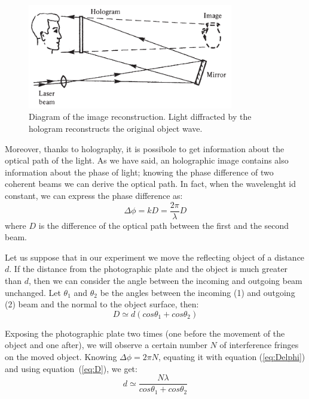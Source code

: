\documentclass[11pt,a4paper]{article}
\begin{document}
\begin{figure}[ht]
\centering
\includegraphics[width=0.8\textwidth]{Hologram_image_reconstruction}
\caption{Diagram of the image reconstruction. Light diffracted by the hologram reconstructs the original object wave.\cite{hariharan_2002}}
\label{fig:hologram_reconstruction}
\end{figure}

Moreover, thanks to holography, it is possibole to get information about the optical path of the light. As we have said, an holographic image contains also information about the phase of light; knowing the phase difference of two coherent beams we can derive the optical path. In fact, when the wavelenght id constant, we can express the phase difference as:
\begin{equation}
\Delta \phi=kD=\frac{2\pi}{\lambda}D\label{eq:Delphi}
\end{equation}
where $D$ is the difference of the optical path between the first and the second beam.

Let us suppose that in our experiment we move the reflecting object of a distance $d$. If the distance from the photographic plate and the object is much greater than $d$, then we can consider the angle between the incoming and outgoing beam unchanged. Let $\theta_1$ and $\theta_2$ be the angles between the incoming (1) and outgoing (2) beam and the normal to the object surface, then: 
\begin{equation}
D\simeq d(cos\theta_1+cos\theta_2)\label{eq:D}
\end{equation}

Exposing the photographic plate two times (one before the movement of the object and one after), we will observe a certain number $N$ of interference fringes on the moved object. Knowing $\Delta \phi=2\pi N$, equating it with equation (\ref{eq:Delphi}) and using equation~(\ref{eq:D}), we get:
\begin{equation}
d\simeq\frac{N\lambda}{cos\theta_1+cos\theta_2}\label{eq:d}
\end{equation}
\end{document}
